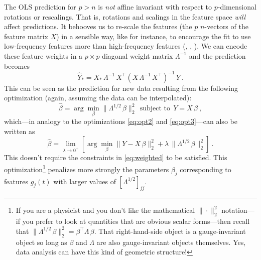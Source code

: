 \documentclass[12pt,letterpaper]{article}
\begin{document}
The OLS prediction for $p>n$ is \emph{not} affine invariant with respect to $p$-dimensional rotations or rescalings.
That is, rotations and scalings in the feature space \emph{will} affect predictions.
It behooves us to re-scale the features (the $p$ $n$-vectors of the feature matrix $X$) in a sensible way, like for instance, to encourage the fit to use low-frequency features more than high-frequency features (\citealt{xie2020weighted}, \citealt{bah2016sample}, \citealt{rauhut2016interpolation}).
We can encode these feature weights in a $p\times p$ diagonal weight matrix $\Lambda^{-1}$ and the prediction becomes
\begin{equation} \label{eq:weighted_sol}
    \hat{Y}_\ast = X_\ast\,\Lambda^{-1}\,X^\top (X\,\Lambda^{-1}\,X^\top)^{-1}\,Y
    ~.
\end{equation}
This can be seen as the prediction for new data resulting from the following optimization (again, assuming the data can be interpolated):
\begin{equation} \label{eq:weighted}
    \hat{\beta} = \arg\min_\beta \|\Lambda^{1/2}\,\beta\|_2^2 ~~\mbox{subject to}~~ Y = X\,\beta
    ~,
\end{equation}
which---in analogy to the optimizations \eqref{eq:opt2} and \eqref{eq:opt3}---can also be written as
\begin{equation}
    \hat{\beta} = \lim_{\lambda\rightarrow 0^+}\left[\arg\min_\beta \|Y - X\,\beta\|_2^2 + \lambda\,\|\Lambda^{1/2}\,\beta\|_2^2\right]
    ~.
\end{equation}
This doesn't require the constraints in \eqref{eq:weighted} to be satisfied. 
This optimization\footnote{If you are a physicist and you don't like the mathematical $\|\cdot\|_2^2$ notation---if you prefer to look at quantities that are obvious scalar forms---then recall that $\|\Lambda^{1/2}\,\beta\|_2^2 = \beta^\top\Lambda\,\beta$.
That right-hand-side object is a gauge-invariant object so long as $\beta$ and $\Lambda$ are also gauge-invariant objects themselves.
Yes, data analysis can have this kind of geometric structure!}
penalizes more strongly the parameters $\beta_j$ corresponding to features $g_j(t)$ with larger values of $[\Lambda^{1/2}]_{jj}$.
\end{document}
